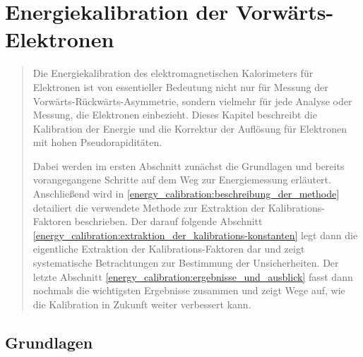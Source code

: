 


%
\chapter{Energiekalibration der Vorwärts-Elektronen}
\label{energy_calibration}

\begin{quote}
    Die Energiekalibration des elektromagnetischen Kalorimeters für Elektronen 
    ist von essentieller Bedeutung nicht nur für Messung der
    Vorwärts-Rückwärts-Asymmetrie, sondern vielmehr für jede Analyse oder
    Messung, die Elektronen einbezieht. Dieses Kapitel beschreibt die
    Kalibration der Energie und die Korrektur der Auflösung für Elektronen mit
    hohen Pseudorapiditäten.

    Dabei werden im ersten Abschnitt zunächst die Grundlagen und bereits
    vorangegangene Schritte auf dem Weg zur Energiemessung erläutert.
    Anschließend wird in \ref{energy_calibration:beschreibung_der_methode}
    detailiert die verwendete Methode zur Extraktion der Kalibrations-Faktoren
    beschrieben. Der darauf folgende Abschnitt
    \ref{energy_calibration:extraktion_der_kalibrations-konstanten} legt dann
    die eigentliche Extraktion der Kalibrations-Faktoren dar und zeigt
    systematische Betrachtungen zur Bestimmung der Unsicherheiten. Der letzte
    Abschnitt \ref{energy_calibration:ergebnisse_und_ausblick} fasst dann
    nochmals die wichtigsten Ergebnisse zusammen und zeigt Wege auf, wie die
    Kalibration in Zukunft weiter verbessert kann.
\end{quote}



%
\section{Grundlagen}
\label{energy_calibration:grundlagen}

